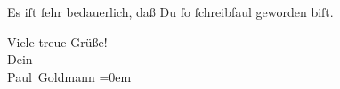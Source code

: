 \pstart
           Es iſt{ }ſehr bedauerlich, daß Du{ }ſo{ }ſchreibfaul geworden biſt.\pend
           
\pstart
           Viele treue Grüße! {\\[\baselineskip]}Dein {\\[\baselineskip]}\spacefill\mbox{Paul Goldmann}\pend
           \leftskip=0em{}\endnumbering{}  \newcommand{\dateiname}{L02906}\newcommand{\titel}{Paul Goldmann an Arthur Schnitzler, 4. 3. 1900}\newcommand{\editorInnen}{Martin Anton Müller und Laura Untner}
